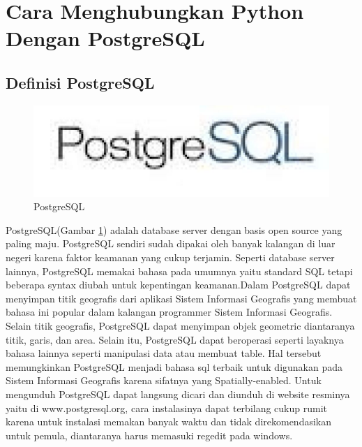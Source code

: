 \section{Cara Menghubungkan Python Dengan PostgreSQL}

\subsection{Definisi PostgreSQL}
\begin{figure}[ht]
	\centerline{\includegraphics[width=1\textwidth]{figures/PostgreSQL.jpg}}
	\caption{PostgreSQL}
	\label{postgres}
\end{figure}
\cite{momjian2001postgresql}PostgreSQL(Gambar \ref{postgres}) adalah database server dengan basis open source yang paling maju. PostgreSQL sendiri sudah dipakai oleh banyak kalangan di luar negeri karena faktor keamanan yang cukup terjamin. Seperti database server lainnya, PostgreSQL memakai bahasa pada umumnya yaitu standard SQL tetapi beberapa syntax diubah untuk kepentingan keamanan.Dalam PostgreSQL dapat menyimpan titik geografis dari aplikasi Sistem Informasi Geografis yang membuat bahasa ini popular dalam kalangan programmer Sistem Informasi Geografis. Selain titik geografis, PostgreSQL dapat menyimpan objek geometric diantaranya titik, garis, dan area. Selain itu, PostgreSQL dapat beroperasi seperti layaknya bahasa lainnya seperti manipulasi data atau membuat table. Hal tersebut memungkinkan PostgreSQL menjadi bahasa sql terbaik untuk digunakan pada Sistem Informasi Geografis karena sifatnya yang Spatially-enabled. Untuk mengunduh PostgreSQL dapat langsung dicari dan diunduh di website resminya yaitu di www.postgresql.org, cara instalasinya dapat terbilang cukup rumit karena untuk instalasi memakan banyak waktu dan tidak direkomendasikan untuk pemula, diantaranya harus memasuki regedit pada windows. 

